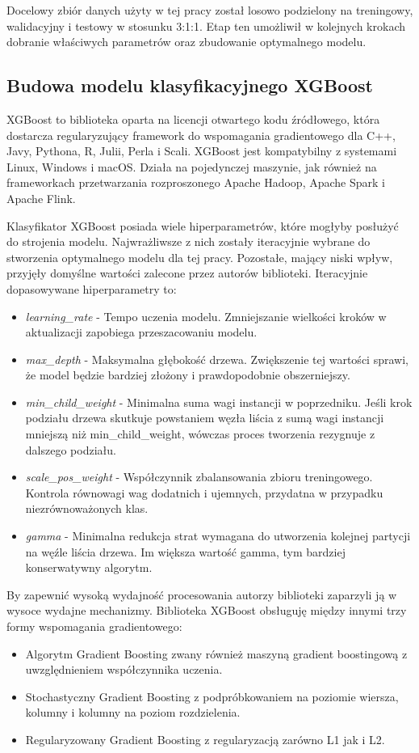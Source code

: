 \documentclass[polish, twoside, 12pt, a4paper]{article}
\theoremstyle{definition}
\theoremstyle{plain}
\theoremstyle{remark}
\begin{document}
Docelowy zbiór danych użyty w tej pracy został losowo podzielony na treningowy, walidacyjny i testowy w stosunku 3:1:1. Etap ten umożliwił w kolejnych krokach dobranie właściwych parametrów oraz zbudowanie optymalnego modelu.

\subsection{Budowa modelu klasyfikacyjnego XGBoost}

XGBoost to biblioteka oparta na licencji otwartego kodu źródłowego, która dostarcza regularyzujący framework do wspomagania gradientowego dla C++, Javy, Pythona, R, Julii, Perla i Scali. XGBoost jest kompatybilny z systemami Linux, Windows i macOS. Działa na pojedynczej maszynie, jak również na frameworkach przetwarzania rozproszonego Apache Hadoop, Apache Spark i Apache Flink. 

Klasyfikator XGBoost posiada wiele hiperparametrów, które mogłyby posłużyć do strojenia modelu. Najwrażliwsze z nich zostały iteracyjnie wybrane do stworzenia optymalnego modelu dla tej pracy. Pozostałe, mający niski wpływ, przyjęły domyślne wartości zalecone przez autorów biblioteki. Iteracyjnie dopasowywane hiperparametry to:
\begin{itemize}
 \item \emph{learning\_rate} - Tempo uczenia modelu. Zmniejszanie wielkości kroków w aktualizacji zapobiega przeszacowaniu modelu.
 \item \emph{max\_depth} - Maksymalna głębokość drzewa. Zwiększenie tej wartości sprawi, że model będzie bardziej złożony i prawdopodobnie obszerniejszy.
 \item \emph{min\_child\_weight} - Minimalna suma wagi instancji w poprzedniku. Jeśli krok podziału drzewa skutkuje powstaniem węzła liścia z sumą wagi instancji mniejszą niż min\_child\_weight, wówczas proces tworzenia rezygnuje z dalszego podziału. 
 \item \emph{scale\_pos\_weight} - Współczynnik zbalansowania zbioru treningowego. Kontrola równowagi wag dodatnich i ujemnych, przydatna w przypadku niezrównoważonych klas.
 \item \emph{gamma} - Minimalna redukcja strat wymagana do utworzenia kolejnej partycji na węźle liścia drzewa. Im większa wartość gamma, tym bardziej konserwatywny algorytm.
\end{itemize}

By zapewnić wysoką wydajność procesowania autorzy biblioteki zaparzyli ją w wysoce wydajne mechanizmy. Biblioteka XGBoost obsługuję między innymi trzy formy wspomagania gradientowego:
\begin{itemize}
  \item Algorytm Gradient Boosting zwany również maszyną gradient boostingową z uwzględnieniem współczynnika uczenia.
  \item Stochastyczny Gradient Boosting z podpróbkowaniem na poziomie wiersza, kolumny i kolumny na poziom rozdzielenia.
  \item Regularyzowany Gradient Boosting z regularyzacją zarówno L1 jak i L2.
\end{itemize}
\end{document}
